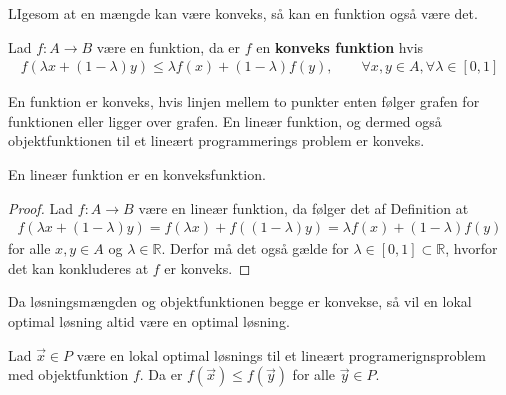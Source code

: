 LIgesom at en mængde kan være konveks, så kan en funktion også være det.
\begin{defn}
Lad $f:A\to B$ være en funktion, da er $f$ en \textbf{konveks funktion} hvis
\begin{align*}
	f(\lambda x + (1-\lambda) y) \leq \lambda f(x) + (1-\lambda)f(y), \qquad \forall x,y \in A, \forall \lambda \in [0,1]
\end{align*}
\end{defn}
En funktion er konveks, hvis linjen mellem to punkter enten følger grafen for funktionen eller ligger over grafen. 
En lineær funktion, og dermed også objektfunktionen til et lineært programmerings problem er konveks.
\begin{stn}
En lineær funktion er en konveksfunktion.
\label{stn:funkon}
\end{stn}
\begin{proof}
Lad $f:A\to B$ være en lineær funktion, da følger det af Definition
at 
\begin{align*}
f(\lambda x + (1-\lambda) y)  = f(\lambda x) + f((1-\lambda)y)  = \lambda f(x) + (1-\lambda)f(y)
\end{align*}
for alle $x,y \in A$ og $\lambda \in \mathds{R}$. 
Derfor må det også gælde for $\lambda \in [0,1] \subset \mathds{R}$, hvorfor det kan konkluderes at $f$ er konveks.
\end{proof}
Da løsningsmængden og objektfunktionen begge er konvekse, så vil en lokal optimal løsning altid være en optimal løsning.
\begin{stn}
Lad $\vec{x} \in P$ være en lokal optimal løsnings til et lineært programerignsproblem  med objektfunktion $f$.
Da er  $f(\vec{x}) \leq f(\vec{y})$ for alle $\vec{y} \in P$.
\end{stn}

